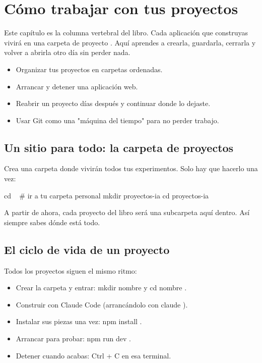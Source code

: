 \documentclass[11pt,a4paper]{book}
\begin{document}
\chapter{Cómo trabajar con tus proyectos}
Este capítulo es la columna vertebral del libro. Cada aplicación que construyas vivirá en una carpeta de proyecto . Aquí aprendes a crearla, guardarla, cerrarla y volver a abrirla otro día sin perder nada.

\begin{itemize}\item Organizar tus proyectos en carpetas ordenadas.\end{itemize}
\begin{itemize}\item Arrancar y detener una aplicación web.\end{itemize}
\begin{itemize}\item Reabrir un proyecto días después y continuar donde lo dejaste.\end{itemize}
\begin{itemize}\item Usar Git como una "máquina del tiempo" para no perder trabajo.\end{itemize}
\section{Un sitio para todo: la carpeta de proyectos}
Crea una carpeta donde vivirán todos tus experimentos. Solo hay que hacerlo una vez:

\begin{codebox}
cd ~            # ir a tu carpeta personal
mkdir proyectos-ia
cd proyectos-ia
\end{codebox}
A partir de ahora, cada proyecto del libro será una subcarpeta aquí dentro. Así siempre sabes dónde está todo.

\section{El ciclo de vida de un proyecto}
Todos los proyectos siguen el mismo ritmo:

\begin{itemize}\item Crear la carpeta y entrar: mkdir nombre y cd nombre .\end{itemize}
\begin{itemize}\item Construir con Claude Code (arrancándolo con claude ).\end{itemize}
\begin{itemize}\item Instalar sus piezas una vez: npm install .\end{itemize}
\begin{itemize}\item Arrancar para probar: npm run dev .\end{itemize}
\begin{itemize}\item Detener cuando acabas: Ctrl + C en esa terminal.\end{itemize}
\end{document}
